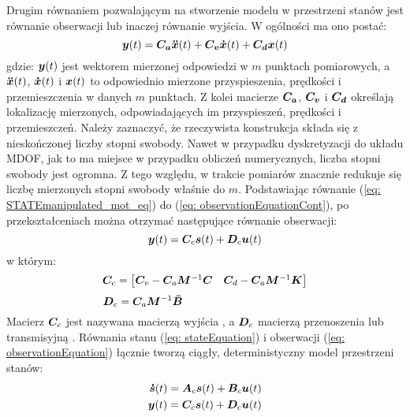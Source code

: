 Drugim równaniem pozwalającym na stworzenie modelu w przestrzeni stanów jest równanie obserwacji  lub inaczej równanie wyjścia. W ogólności ma ono postać:
\begin{equation} \label{eq: observationEquationCont}
	\bm{y}(t) = \bm{C_a}\bm{\ddot{x}}(t) + \bm{C_v}\bm{\dot{x}}(t) +\bm{C_d}\bm{x}(t)
\end{equation}
gdzie: $\bm{y}(t)$ jest wektorem mierzonej odpowiedzi w $m$ punktach pomiarowych, a $\bm{\ddot{x}}(t)$, $\bm{\dot{x}}(t)$ i $\bm{x}(t)$ to odpowiednio mierzone przyspieszenia, prędkości i przemieszczenia w danych $m$ punktach. Z kolei macierze $\bm{C_a}$, $\bm{C_v}$ i $\bm{C_d}$ określają lokalizację mierzonych, odpowiadających im przyspieszeń, prędkości i przemieszczeń. Należy zaznaczyć, że rzeczywista konstrukcja składa się z nieskończonej liczby stopni swobody. Nawet w przypadku dyskretyzacji do układu MDOF, jak to ma miejsce w przypadku obliczeń numerycznych, liczba stopni swobody jest ogromna. Z tego względu, w trakcie pomiarów znacznie redukuje się liczbę mierzonych stopni swobody właśnie do $m$. Podstawiając równanie (\ref{eq: STATEmanipulated_mot_eq}) do (\ref{eq: observationEquationCont}), po przekształceniach można otrzymać następujące równanie obserwacji:
\begin{equation} \label{eq: observationEquation}
	\bm{y}(t) = \bm{C}_c\bm{s}(t)+\bm{D}_c\bm{u}(t)
\end{equation}
w którym:
\begin{equation}
	\bm{C}_c = 
	\begin{bmatrix} 
		\bm{C}_v-\bm{C}_a\bm{M}^{-1}\bm{C}  &  \bm{C}_d-\bm{C}_a\bm{M}^{-1}\bm{K}
	\end{bmatrix}
\end{equation}
\begin{equation}
	\bm{D}_c = \bm{C}_a\bm{M}^{-1}\bm{\bar{B}} \phantom{\qquad\qquad\qquad\qquad\qquad\quad.}
\end{equation}
Macierz $\bm{C}_c$ jest nazywana macierzą wyjścia , a $\bm{D}_c$ macierzą przenoszenia lub transmisyjną . Równania stanu (\ref{eq: stateEquation}) i obserwacji (\ref{eq: observationEquation}) łącznie tworzą ciągły, deterministyczny model przestrzeni stanów:
\begin{equation} \label{eq: con_state_space_model}
	\begin{aligned}
		\bm{\dot{s}}(t)= \bm{A}_c\bm{s}(t)+\bm{B}_c\bm{u}(t) \\
		\bm{y}(t) = \bm{C}_c\bm{s}(t)+\bm{D}_c\bm{u}(t)
	\end{aligned}
\end{equation}

